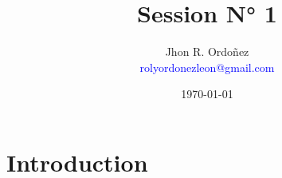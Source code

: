 \documentclass{article}
\title{Session N° 1}
\author{
        Jhon R. Ordoñez \\
        \textcolor{blue}{rolyordonezleon@gmail.com}
    }
\date{\today}
\begin{document}
        \maketitle
        \thispagestyle{fancy}
    \section{Introduction}
        \lipsum[1]
    
\end{document}

